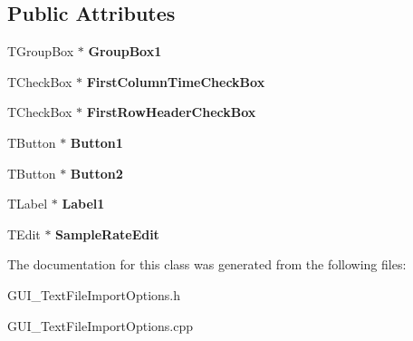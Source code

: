 \subsection*{Public Attributes}
\begin{DoxyCompactItemize}
\item 
\hypertarget{class_t_text_file_import_options_form_a6e281f6a4fed377fc3b958cea0d323b3}{T\+Group\+Box $\ast$ {\bfseries Group\+Box1}}\label{class_t_text_file_import_options_form_a6e281f6a4fed377fc3b958cea0d323b3}

\item 
\hypertarget{class_t_text_file_import_options_form_ae37a9442c6494d25ce9fb7f39216b347}{T\+Check\+Box $\ast$ {\bfseries First\+Column\+Time\+Check\+Box}}\label{class_t_text_file_import_options_form_ae37a9442c6494d25ce9fb7f39216b347}

\item 
\hypertarget{class_t_text_file_import_options_form_afb3f403b809fbb94a0b22320243ed05d}{T\+Check\+Box $\ast$ {\bfseries First\+Row\+Header\+Check\+Box}}\label{class_t_text_file_import_options_form_afb3f403b809fbb94a0b22320243ed05d}

\item 
\hypertarget{class_t_text_file_import_options_form_afac72d72e29db29aedeb11d1882c5c28}{T\+Button $\ast$ {\bfseries Button1}}\label{class_t_text_file_import_options_form_afac72d72e29db29aedeb11d1882c5c28}

\item 
\hypertarget{class_t_text_file_import_options_form_a15f35b24c869236822ff904bf183ae22}{T\+Button $\ast$ {\bfseries Button2}}\label{class_t_text_file_import_options_form_a15f35b24c869236822ff904bf183ae22}

\item 
\hypertarget{class_t_text_file_import_options_form_a05a85477fb9bcc926092bee61930fd34}{T\+Label $\ast$ {\bfseries Label1}}\label{class_t_text_file_import_options_form_a05a85477fb9bcc926092bee61930fd34}

\item 
\hypertarget{class_t_text_file_import_options_form_a7f7f378dd7117aabd71610bd095632ec}{T\+Edit $\ast$ {\bfseries Sample\+Rate\+Edit}}\label{class_t_text_file_import_options_form_a7f7f378dd7117aabd71610bd095632ec}

\end{DoxyCompactItemize}


The documentation for this class was generated from the following files\+:\begin{DoxyCompactItemize}
\item 
G\+U\+I\+\_\+\+Text\+File\+Import\+Options.\+h\item 
G\+U\+I\+\_\+\+Text\+File\+Import\+Options.\+cpp\end{DoxyCompactItemize}
